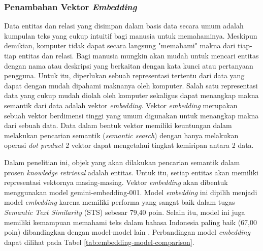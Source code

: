 \subsubsection{Penambahan Vektor \textit{Embedding}}

Data entitas dan relasi yang disimpan dalam basis data secara umum adalah kumpulan teks yang cukup intuitif bagi manusia untuk memahaminya.
Meskipun demikian, komputer tidak dapat secara langsung "memahami" makna dari tiap-tiap entitas dan relasi.
Bagi manusia mungkin akan mudah untuk mencari entitas dengan nama atau deskripsi yang berkaitan dengan kata kunci atau pertanyaan pengguna.
Untuk itu, diperlukan sebuah representasi tertentu dari data yang dapat dengan mudah dipahami maknanya oleh komputer.
Salah satu representasi data yang cukup mudah diolah oleh komputer sekaligus dapat menangkap makna semantik dari data adalah vektor \textit{embedding}.
Vektor \textit{embedding} merupakan sebuah vektor berdimensi tinggi yang umum digunakan untuk menangkap makna dari sebuah data.
Data dalam bentuk vektor memiliki keuntungan dalam melakukan pencarian semantik (\textit{semantic search}) dengan hanya melakukan operasi \textit{dot product} 2 vektor dapat mengetahui tingkat kemiripan antara 2 data.

Dalam penelitian ini, objek yang akan dilakukan pencarian semantik dalam prosen \textit{knowledge retrieval} adalah entitas.
Untuk itu, setiap entitas akan memiliki representasi vektornya masing-masing.
Vektor \textit{embedding} akan dibentuk menggunakan model gemini-embedding-001.
Model \textit{embedding} ini dipilih menjadi model \textit{embedding} karena memiliki performa yang sangat baik dalam tugas \textit{Semantic Text Similarity} (STS) sebesar 79,40 poin.
Selain itu, model ini juga memiliki kemampuan memahami teks dalam bahasa Indonesia paling baik (67,00 poin) dibandingkan dengan model-model lain \cite{enevoldsen2025MMTEBmassivemultilingualtextEmbeddingModelComp}.
Perbandingan model \textit{embedding} dapat dilihat pada Tabel \ref{tab:embedding-model-comparison}.


